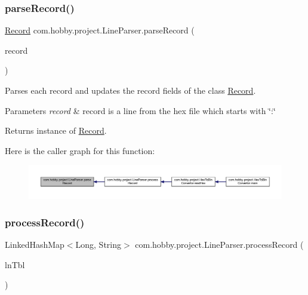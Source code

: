 \subsubsection{\texorpdfstring{parse\+Record()}{parseRecord()}}
{\footnotesize\ttfamily \hyperlink{classcom_1_1hobby_1_1project_1_1_record}{Record} com.\+hobby.\+project.\+Line\+Parser.\+parse\+Record (\begin{DoxyParamCaption}\item[{String}]{record }\end{DoxyParamCaption})}

Parses each record and updates the record fields of the class \hyperlink{classcom_1_1hobby_1_1project_1_1_record}{Record}.


\begin{DoxyParams}{Parameters}
{\em record} & record is a line from the hex file which starts with \char`\"{}\+:\char`\"{}\\
\hline
\end{DoxyParams}
\begin{DoxyReturn}{Returns}
instance of \hyperlink{classcom_1_1hobby_1_1project_1_1_record}{Record}. 
\end{DoxyReturn}
Here is the caller graph for this function\+:
\nopagebreak
\begin{figure}[H]
\begin{center}
\leavevmode
\includegraphics[width=350pt]{classcom_1_1hobby_1_1project_1_1_line_parser_aefe344a1777568d60dd3dc90bb5c02d2_icgraph}
\end{center}
\end{figure}
\mbox{\label{classcom_1_1hobby_1_1project_1_1_line_parser_a6772015da2caff24e4d3c94589b1a5ff}} 
\subsubsection{\texorpdfstring{process\+Record()}{processRecord()}}
{\footnotesize\ttfamily Linked\+Hash\+Map$<$Long, String$>$ com.\+hobby.\+project.\+Line\+Parser.\+process\+Record (\begin{DoxyParamCaption}\item[{Linked\+Hash\+Map$<$ Integer, String $>$}]{ln\+Tbl }\end{DoxyParamCaption})}

